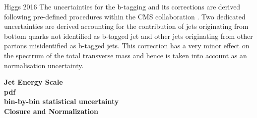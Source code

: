 Higgs 2016
The uncertainties for the b-tagging and its corrections are derived following pre-defined
procedures within the CMS collaboration \cite{bjetID}. Two dedicated uncertainties are derived
accounting for the contribution of jets originating from bottom quarks not identified as
b-tagged jet and other jets originating from other partons misidentified as b-tagged jets.
This correction has a very minor effect on the spectrum of the total transverse mass and
hence is taken into account as an normalisation uncertainty.




\textbf{Jet Energy Scale}\\

\textbf{pdf}\\

\textbf{bin-by-bin statistical uncertainty}\\

\textbf{Closure and Normalization}\\




